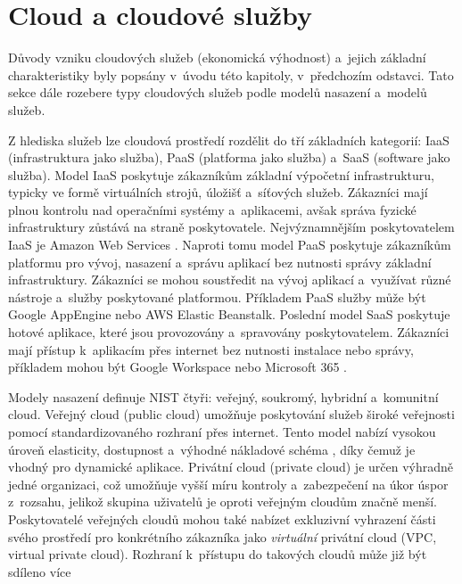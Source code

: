 \documentclass[czech, ing, kiv, he, iso690]{fasthesis}
\begin{document}
\section{Cloud a cloudové služby}

Důvody vzniku cloudových služeb (ekonomická výhodnost) a~jejich základní charakteristiky byly popsány v~úvodu této kapitoly, v~předchozím odstavci. Tato sekce dále rozebere typy cloudových služeb podle modelů nasazení a~modelů služeb.

Z hlediska služeb lze cloudová prostředí rozdělit do tří základních kategorií: IaaS (infrastruktura jako služba), PaaS (platforma jako služba) a~SaaS (software jako služba). Model IaaS poskytuje zákazníkům základní výpočetní infrastrukturu, typicky ve formě virtuálních strojů, úložišť a~síťových služeb. Zákazníci mají plnou kontrolu nad operačními systémy a~aplikacemi, avšak správa fyzické infrastruktury zůstává na straně poskytovatele. Nejvýznamnějším poskytovatelem IaaS je Amazon Web Services \cite{cloud_theory_practice, distrib_sys_4}. Naproti tomu model PaaS poskytuje zákazníkům platformu pro vývoj, nasazení a~správu aplikací bez nutnosti správy základní infrastruktury. Zákazníci se mohou soustředit na vývoj aplikací a~využívat různé nástroje a~služby poskytované platformou. Příkladem PaaS služby může být Google AppEngine nebo AWS Elastic Beanstalk. Poslední model SaaS poskytuje hotové aplikace, které jsou provozovány a~spravovány poskytovatelem. Zákazníci mají přístup k~aplikacím přes internet bez nutnosti instalace nebo správy, příkladem mohou být Google Workspace nebo Microsoft 365 \cite{cloud_theory_practice, distrib_sys_4}.

Modely nasazení definuje NIST čtyři: veřejný, soukromý, hybridní a~komunitní cloud. Veřejný cloud (public cloud) umožňuje poskytování služeb široké veřejnosti pomocí standardizovaného rozhraní přes internet. Tento model nabízí vysokou úroveň elasticity, dostupnost a~výhodné nákladové schéma , díky čemuž je vhodný pro dynamické aplikace. Privátní cloud (private cloud) je určen výhradně jedné organizaci, což umožňuje vyšší míru kontroly a~zabezpečení na úkor úspor z~rozsahu, jelikož skupina uživatelů je oproti veřejným cloudům značně menší. Poskytovatelé veřejných cloudů mohou také nabízet exkluzivní vyhrazení části svého prostředí pro konkrétního zákazníka jako \emph{virtuální} privátní cloud (VPC, virtual private cloud). Rozhraní k~přístupu do takových cloudů může již být sdíleno více  \cite{cloud_patterns}
\end{document}

